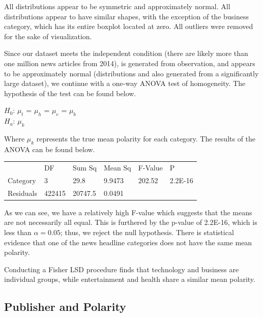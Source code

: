 \documentclass[12pt]{article}
\begin{document}
All distributions appear to be symmetric and approximately normal. All distributions appear to have similar shapes, with the exception of the business category, which has its entire boxplot located at zero. All outliers were removed for the sake of visualization.

Since our dataset meets the independent condition (there are likely more than one million news articles from 2014), is generated from observation, and appears to be approximately normal (distributions and also generated from a significantly large dataset), we continue with a one-way ANOVA test of homogeneity. The hypothesis of the test can be found below.

\begin{center}
    $H_{0}$: $\mu_{t}$ = $\mu_{h}$ = $\mu_{e}$ = $\mu_{b}$ \\
    $H_{a}$: \;$\mu_{k}$\;\\
\end{center}

Where $\mu_{k}$ represents the true mean polarity for each category. The results of the ANOVA can be found below.

\begin{table}[H]
    \centering
    \begin{tabular}{|llllll|}
    \hline
                                    & DF     & Sum Sq  & Mean Sq & F-Value & P       \\ \cline{2-6} 
    \multicolumn{1}{|l|}{Category}  & 3      & 29.8    & 9.9473  & 202.52  & 2.2E-16 \\
    \multicolumn{1}{|l|}{Residuals} & 422415 & 20747.5 & 0.0491  &         &         \\ \hline
    \end{tabular}
\end{table}

As we can see, we have a relatively high F-value which suggests that the means are not necessarily all equal. This is furthered by the p-value of 2.2E-16, which is less than $\alpha = 0.05$; thus, we reject the null hypothesis. There is statistical evidence that one of the news headline categories does not have the same mean polarity.

Conducting a Fisher LSD procedure finds that technology and business are individual groups, while entertainment and health share a similar mean polarity.

\subsection{Publisher and Polarity}
\end{document}
